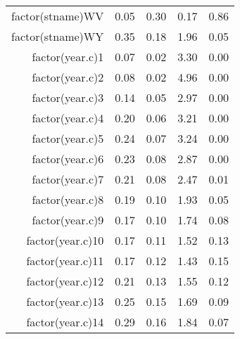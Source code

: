 \begin{table}[ht]
\begin{tabular}{rrrrr}
  factor(stname)WV & 0.05 & 0.30 & 0.17 & 0.86 \\ 
  factor(stname)WY & 0.35 & 0.18 & 1.96 & 0.05 \\ 
  factor(year.c)1 & 0.07 & 0.02 & 3.30 & 0.00 \\ 
  factor(year.c)2 & 0.08 & 0.02 & 4.96 & 0.00 \\ 
  factor(year.c)3 & 0.14 & 0.05 & 2.97 & 0.00 \\ 
  factor(year.c)4 & 0.20 & 0.06 & 3.21 & 0.00 \\ 
  factor(year.c)5 & 0.24 & 0.07 & 3.24 & 0.00 \\ 
  factor(year.c)6 & 0.23 & 0.08 & 2.87 & 0.00 \\ 
  factor(year.c)7 & 0.21 & 0.08 & 2.47 & 0.01 \\ 
  factor(year.c)8 & 0.19 & 0.10 & 1.93 & 0.05 \\ 
  factor(year.c)9 & 0.17 & 0.10 & 1.74 & 0.08 \\ 
  factor(year.c)10 & 0.17 & 0.11 & 1.52 & 0.13 \\ 
  factor(year.c)11 & 0.17 & 0.12 & 1.43 & 0.15 \\ 
  factor(year.c)12 & 0.21 & 0.13 & 1.55 & 0.12 \\ 
  factor(year.c)13 & 0.25 & 0.15 & 1.69 & 0.09 \\ 
  factor(year.c)14 & 0.29 & 0.16 & 1.84 & 0.07 \\ 
   \hline
\end{tabular}
\end{table}

